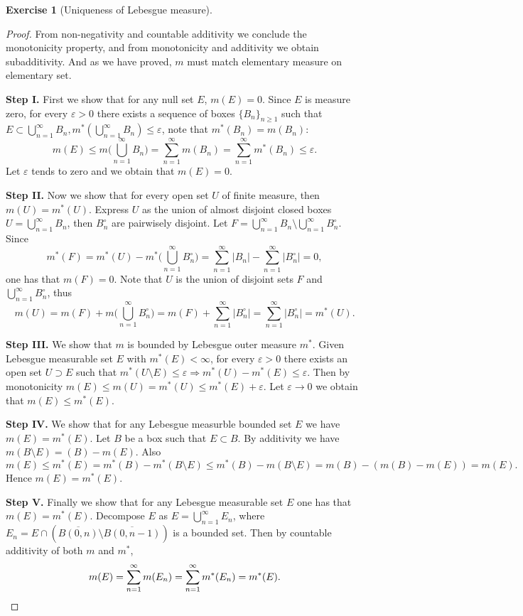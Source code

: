 \documentclass[a4paper]{article}
\newtheorem{ex}{Exercise}[subsection]
\begin{document}
\setcounter{ex}{22}
\begin{ex}[Uniqueness of Lebesgue measure]\end{ex}
\begin{proof}
From non-negativity and countable additivity we conclude the monotonicity property, and from monotonicity and 
additivity we obtain subadditivity. And as we have proved, $m$ must match elementary measure on elementary set.

{\bfseries Step I.} First we show that for any null set $E$, $m(E) = 0$. Since $E$ is measure zero, for every 
$\varepsilon > 0$ there exists a sequence of boxes $\{B_n\}_{n \geq 1}$ such that 
$E \subset \bigcup_{n = 1}^\infty B_n, m^*(\bigcup_{n = 1}^\infty B_n) \leq \varepsilon$, note that $m^*(B_n) = m(B_n)$:
$$
m(E) \leq m\Big(\bigcup_{n = 1}^\infty B_n\Big) = \sum_{n = 1}^\infty m(B_n) = \sum_{n = 1}^\infty m^*(B_n) \leq \varepsilon.
$$
Let $\varepsilon$ tends to zero and we obtain that $m(E) = 0$.

{\bfseries Step II.} Now we show that for every open set $U$ of finite measure, then $m(U) = m^*(U)$. Express 
$U$ as the union of almost disjoint closed boxes $U = \bigcup_{n = 1}^\infty B_n$, then $B_n^\circ$ are pairwisely
disjoint. Let $F = \bigcup_{n = 1}^\infty B_n \setminus \bigcup_{n = 1}^\infty B_n^\circ$. Since $$
m^*(F) = m^*(U) - m^*\Big(\bigcup_{n = 1}^\infty B_n^\circ\Big) = \sum_{n = 1}^\infty |B_n| - \sum_{n = 1}^\infty
|B_n^\circ| = 0,
$$one has that $m(F) = 0$. Note that $U$ is the union of disjoint sets $F$ and $\bigcup_{n = 1}^\infty B_n^\circ$, thus
$$
m(U) = m(F) + m\Big(\bigcup_{n = 1}^\infty B_n^\circ\Big) = m(F) + \sum_{n = 1}^\infty |B_n^\circ| = \sum_{n = 1}^\infty
|B_n^\circ| = m^*(U).
$$

{\bfseries Step III.} We show that $m$ is bounded by Lebesgue outer measure $m^*$. Given Lebesgue measurable set
$E$ with $m^*(E) < \infty$, for every $\varepsilon > 0$ there exists an open set $U \supset E$ such that
$m^*(U \setminus E) \leq \varepsilon \Rightarrow m^*(U) - m^*(E) \leq \varepsilon$. Then by monotonicity 
$m(E) \leq m(U) = m^*(U) \leq m^*(E) + \varepsilon$. Let $\varepsilon \to 0$ we obtain that $m(E) \leq m^*(E)$.

{\bfseries Step IV.} We show that for any Lebesgue measurble bounded set $E$ we have $m(E) = m^*(E)$. Let $B$ be
a box such that $E \subset B$. By additivity we have $m(B \setminus E) = (B) - m(E)$. Also$$
m(E) \leq m^*(E) = m^*(B) - m^*(B \setminus E) \leq m^*(B) - m(B \setminus E) = m(B) - (m(B) - m(E)) = m(E).
$$Hence $m(E) = m^*(E)$.

{\bfseries Step V.} Finally we show that for any Lebesgue measurable set $E$ one has that $m(E) = m^*(E)$. Decompose
$E$ as $E = \bigcup_{n = 1}^\infty E_n$, where $E_n = E \cap (\overline{B(0, n)} \setminus \overline{B(0, n - 1)})$
is a bounded set.
Then by countable additivity of both $m$ and $m^*$, \[
m(E) = \sum_{n = 1}^\infty m(E_n) = \sum_{n = 1}^\infty m^*(E_n) = m^*(E).\qedhere
\]
\end{proof}
\end{document}
